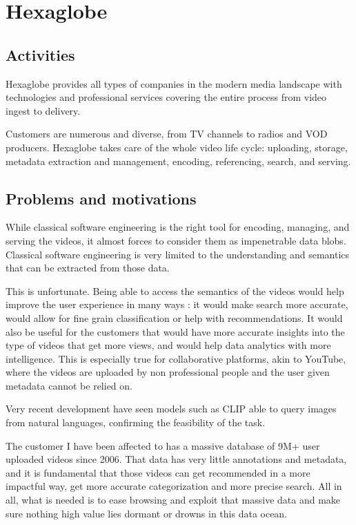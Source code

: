 \chapter{Hexaglobe}



\section{Activities}

Hexaglobe provides all types of companies in the modern media landscape with technologies and professional services covering the entire process from video ingest to delivery.

Customers are numerous and diverse, from TV channels to radios and \ac{VOD} producers. Hexaglobe takes care of the whole video life cycle: uploading, storage, metadata extraction and management, encoding, referencing, search, and serving.

\section{Problems and motivations}

While classical software engineering is the right tool for encoding, managing, and serving the videos, it almost forces to consider them as impenetrable data blobs. Classical software engineering is very limited to the understanding and semantics that can be extracted from those data.

This is unfortunate. Being able to access the semantics of the videos would help improve the user experience in many ways \citep{contentretrieval}: it would make search more accurate, would allow for fine grain classification or help with recommendations. It would also be useful for the customers that would have more accurate insights into the type of videos that get more views, and would help data analytics with more intelligence. This is especially true for collaborative platforms, akin to YouTube, where the videos are uploaded by non professional people and the user given metadata cannot be relied on.

Very recent development have seen models such as \ac{CLIP} \citep{openaiclip} able to query images from natural languages, confirming the feasibility of the task.

The customer I have been affected to has a massive database of 9M+ user uploaded videos since 2006. That data has very little annotations and metadata, and it is fundamental that those videos can get recommended in a more impactful way, get more accurate categorization and more precise search. All in all, what is needed is to ease browsing and exploit that massive data and make sure nothing high value lies dormant or drowns in this data ocean.

